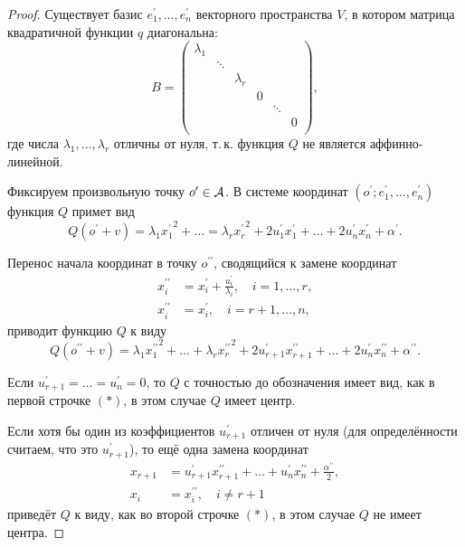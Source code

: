 \begin{proof}
    Существует базис $e_1^\prime, \ldots, e_n^\prime$ векторного пространства $V$, в котором матрица квадратичной функции $q$ диагональна:
    \[
        B =
        \begin{pmatrix}
            \lambda_1 &  &  &  &  &  \\
              & \ddots &  &  &  & \\
              &  & \lambda_r &  &  & \\
              &  &  & 0 &  & \\
              &  &  &  & \ddots & \\
              &  &  &  & & 0\\
        \end{pmatrix},
    \]
    где числа $\lambda_1, \ldots, \lambda_r$ отличны от нуля, т.\,к. функция $Q$ не является аффинно-линейной.

    Фиксируем произвольную точку $o^\prime \in \mathcal{A}$. В системе координат $(o^\prime; e_1^\prime, \ldots, e_n^\prime)$ функция $Q$ примет вид
    \[
        Q(o^\prime + v) = \lambda_1{x_1^\prime}^2 + \ldots = \lambda_r{x_r^\prime}^2 + 2u_1^\prime x_1^\prime + \ldots + 2u_n^\prime x_n^\prime + \alpha^\prime.
    \]

    Перенос начала координат в точку $o^{\prime\prime}$, сводящийся к замене координат
    \begin{align*}
        x_i^{\prime\prime} &= x_i^\prime + \frac{u_i^\prime}{\lambda_i},\quad i = 1, \ldots, r,\\
        x_i^{\prime\prime} &= x_i^\prime,\quad i = r + 1, \ldots, n,
    \end{align*}
    приводит функцию $Q$ к виду
    \[
        Q(o^{\prime\prime} + v) = \lambda_1{x_1^{\prime\prime}}^2 + \ldots + \lambda_r{x_r^{\prime\prime}}^2 + 2u_{r + 1}^\prime x_{r + 1}^{\prime\prime} + \ldots + 2u_n^\prime x_n^{\prime\prime} + \alpha^{\prime\prime}.
    \]

    Если $u^\prime_{r + 1} = \ldots = u_n^\prime = 0$, то $Q$ с точностью до обозначения имеет вид, как в первой строчке $(\ast)$, в этом случае $Q$ имеет центр.

    Если хотя бы один из коэффициентов $u_{r + 1}^\prime$ отличен от нуля (для определённости считаем, что это $u_{r + 1}^\prime$), то ещё одна замена координат
    \begin{align*}
        x_{r + 1} &= u^\prime_{r + 1}x_{r + 1}^{\prime\prime} + \ldots + u_n^\prime x_n^{\prime\prime} + \frac{\alpha^{\prime\prime}}{2},\\
        x_i &= x_i^{\prime\prime},\quad i \ne r + 1
    \end{align*}
    приведёт $Q$ к виду, как во второй строчке $(\ast)$, в этом случае $Q$ не имеет центра.
\end{proof}

